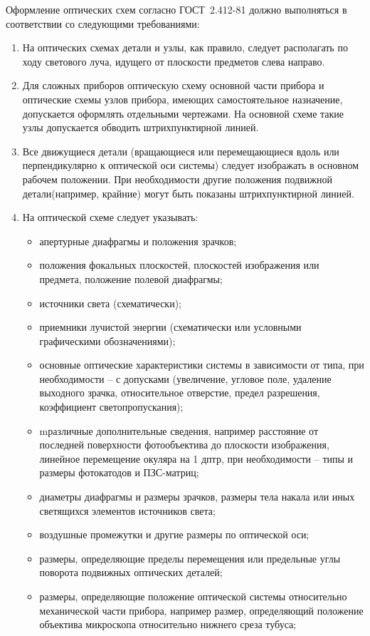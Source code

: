 Оформление оптических схем согласно ГОСТ~2.412-81 должно выполняться в соответствии со следующими требованиями:
\begin{enumerate}
	\item На оптических схемах детали и узлы, как правило, следует располагать по ходу светового луча, идущего от плоскости предметов слева направо. 
	\item Для сложных приборов оптическую схему основной части прибора и оптические схемы узлов прибора, имеющих самостоятельное назначение, допускается  оформлять отдельными чертежами. На основной схеме такие узлы допускается обводить штрихпунктирной линией.
	\item Все движущиеся детали (вращающиеся или перемещающиеся вдоль или перпендикулярно к оптической оси системы) следует изображать в основном рабочем положении. При необходимости другие положения подвижной детали(например, крайние) могут быть показаны штрихпунктирной линией.
	\item На оптической схеме следует указывать:
	\begin{itemize}
		\item апертурные диафрагмы и положения зрачков;
		\item положения фокальных плоскостей, плоскостей изображения или предмета, положение полевой диафрагмы;
		\item источники света (схематически);
		\item приемники лучистой энергии (схематически или условными графическими обозначениями);
		\item основные оптические характеристики системы в зависимости от типа, при необходимости -- с допусками (увеличение, угловое поле, удаление выходного зрачка, относительное отверстие, предел разрешения, коэффициент светопропускания);
		\item mразличные дополнительные сведения, например расстояние от последней поверхности фотообъектива до плоскости изображения, линейное перемещение окуляра на 1 дптр, при необходимости -- типы и размеры фотокатодов и ПЗС-матриц;
		\item диаметры диафрагмы и размеры зрачков, размеры тела накала или иных светящихся элементов источников света;
		\item воздушные промежутки и другие размеры по оптической оси;
		\item размеры, определяющие пределы перемещения или предельные углы поворота подвижных оптических деталей;
		\item размеры, определяющие положение оптической системы относительно механической части прибора, например размер, определяющий положение объектива микроскопа относительно нижнего среза тубуса;

\end{itemize}
\end{enumerate}
